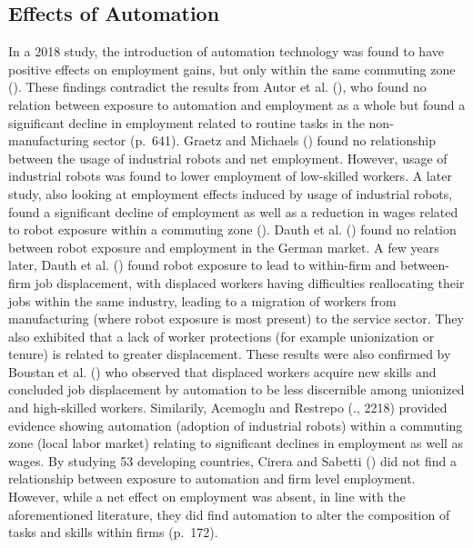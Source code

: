 \documentclass[
  12pt,
  a4paperpaper,
]{article}
\begin{document}
\subsection{Effects of
Automation}\label{sec-effects-of-automation-on-labor}

In a 2018 study, the introduction of automation technology was found to
have positive effects on employment gains, but only within the same
commuting zone (). These findings contradict the results from Autor et al.
(), who found no
relation between exposure to automation and employment as a whole but
found a significant decline in employment related to routine tasks in
the non-manufacturing sector (p.~641). Graetz and Michaels
() found no relationship
between the usage of industrial robots and net employment. However,
usage of industrial robots was found to lower employment of low-skilled
workers. A later study, also looking at employment effects induced by
usage of industrial robots, found a significant decline of employment as
well as a reduction in wages related to robot exposure within a
commuting zone (). Dauth et al.
() found no relation
between robot exposure and employment in the German market. A few years
later, Dauth et al. () found robot exposure to lead to within-firm and between-firm
job displacement, with displaced workers having difficulties
reallocating their jobs within the same industry, leading to a migration
of workers from manufacturing (where robot exposure is most present) to
the service sector. They also exhibited that a lack of worker
protections (for example unionization or tenure) is related to greater
displacement. These results were also confirmed by Boustan et al.
() who observed
that displaced workers acquire new skills and concluded job displacement
by automation to be less discernible among unionized and high-skilled
workers. Similarily, Acemoglu and Restrepo
(., 2218) provided
evidence showing automation (adoption of industrial robots) within a
commuting zone (local labor market) relating to significant declines in
employment as well as wages. By studying 53 developing countries, Cirera
and Sabetti () did not
find a relationship between exposure to automation and firm level
employment. However, while a net effect on employment was absent, in
line with the aforementioned literature, they did find automation to
alter the composition of tasks and skills within firms (p.~172).
\end{document}
